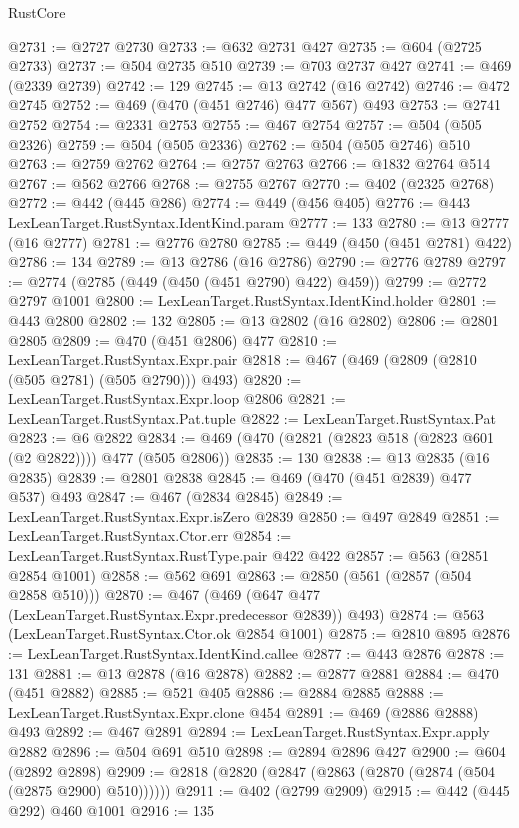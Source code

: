 \begin{lexlean}{RustCore}
\begin{coremodule}
@2731 := @2727 @2730
@2733 := @632 @2731 @427
@2735 := @604 (@2725 @2733)
@2737 := @504 @2735 @510
@2739 := @703 @2737 @427
@2741 := @469 (@2339 @2739)
@2742 := 129
@2745 := @13 @2742 (@16 @2742)
@2746 := @472 @2745
@2752 := @469 (@470 (@451 @2746) @477 @567) @493
@2753 := @2741 @2752
@2754 := @2331 @2753
@2755 := @467 @2754
@2757 := @504 (@505 @2326)
@2759 := @504 (@505 @2336)
@2762 := @504 (@505 @2746) @510
@2763 := @2759 @2762
@2764 := @2757 @2763
@2766 := @1832 @2764 @514
@2767 := @562 @2766
@2768 := @2755 @2767
@2770 := @402 (@2325 @2768)
@2772 := @442 (@445 @286)
@2774 := @449 (@456 @405)
@2776 := @443 LexLeanTarget.RustSyntax.IdentKind.param
@2777 := 133
@2780 := @13 @2777 (@16 @2777)
@2781 := @2776 @2780
@2785 := @449 (@450 (@451 @2781) @422)
@2786 := 134
@2789 := @13 @2786 (@16 @2786)
@2790 := @2776 @2789
@2797 := @2774 (@2785 (@449 (@450 (@451 @2790) @422) @459))
@2799 := @2772 @2797 @1001
@2800 := LexLeanTarget.RustSyntax.IdentKind.holder
@2801 := @443 @2800
@2802 := 132
@2805 := @13 @2802 (@16 @2802)
@2806 := @2801 @2805
@2809 := @470 (@451 @2806) @477
@2810 := LexLeanTarget.RustSyntax.Expr.pair
@2818 := @467 (@469 (@2809 (@2810 (@505 @2781) (@505 @2790))) @493)
@2820 := LexLeanTarget.RustSyntax.Expr.loop @2806
@2821 := LexLeanTarget.RustSyntax.Pat.tuple
@2822 := LexLeanTarget.RustSyntax.Pat
@2823 := @6 @2822
@2834 := @469 (@470 (@2821 (@2823 @518 (@2823 @601 (@2 @2822)))) @477 (@505 @2806))
@2835 := 130
@2838 := @13 @2835 (@16 @2835)
@2839 := @2801 @2838
@2845 := @469 (@470 (@451 @2839) @477 @537) @493
@2847 := @467 (@2834 @2845)
@2849 := LexLeanTarget.RustSyntax.Expr.isZero @2839
@2850 := @497 @2849
@2851 := LexLeanTarget.RustSyntax.Ctor.err
@2854 := LexLeanTarget.RustSyntax.RustType.pair @422 @422
@2857 := @563 (@2851 @2854 @1001)
@2858 := @562 @691
@2863 := @2850 (@561 (@2857 (@504 @2858 @510)))
@2870 := @467 (@469 (@647 @477 (LexLeanTarget.RustSyntax.Expr.predecessor @2839)) @493)
@2874 := @563 (LexLeanTarget.RustSyntax.Ctor.ok @2854 @1001)
@2875 := @2810 @895
@2876 := LexLeanTarget.RustSyntax.IdentKind.callee
@2877 := @443 @2876
@2878 := 131
@2881 := @13 @2878 (@16 @2878)
@2882 := @2877 @2881
@2884 := @470 (@451 @2882)
@2885 := @521 @405
@2886 := @2884 @2885
@2888 := LexLeanTarget.RustSyntax.Expr.clone @454
@2891 := @469 (@2886 @2888) @493
@2892 := @467 @2891
@2894 := LexLeanTarget.RustSyntax.Expr.apply @2882
@2896 := @504 @691 @510
@2898 := @2894 @2896 @427
@2900 := @604 (@2892 @2898)
@2909 := @2818 (@2820 (@2847 (@2863 (@2870 (@2874 (@504 (@2875 @2900) @510))))))
@2911 := @402 (@2799 @2909)
@2915 := @442 (@445 @292) @460 @1001
@2916 := 135

\end{coremodule}
\end{lexlean}
